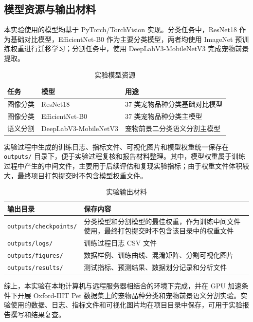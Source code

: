 \documentclass[UTF8,a4paper,12pt]{ctexart}
\begin{document}
\subsection{模型资源与输出材料}

本实验使用的模型均基于 PyTorch/TorchVision 实现。分类任务中，ResNet18 作为基础对比模型，EfficientNet-B0 作为主要分类模型，两者均使用 ImageNet 预训练权重进行迁移学习；分割任务中，使用 DeepLabV3-MobileNetV3 完成宠物前景提取。

\begin{table}[H]
\centering
\caption{实验模型资源}
\label{tab:model-resources}
\begin{tabular}{p{}p{}p{}}
\toprule
任务 & 模型 & 用途 \\
\midrule
图像分类 & ResNet18 & 37 类宠物品种分类基础对比模型 \\
图像分类 & EfficientNet-B0 & 37 类宠物品种分类主模型 \\
语义分割 & DeepLabV3-MobileNetV3 & 宠物前景二分类语义分割主模型 \\
\bottomrule
\end{tabular}
\end{table}

实验过程中生成的训练日志、指标文件、可视化图片和模型权重统一保存在 \texttt{outputs/} 目录下，便于实验过程复核和报告材料整理。其中，模型权重属于训练过程中产生的中间文件，主要用于后续评估和复现实验指标；由于权重文件体积较大，最终项目打包提交时不包含模型权重文件。

\begin{table}[H]
\centering
\caption{实验输出材料}
\label{tab:output-materials}
\begin{tabular}{p{}p{}}
\toprule
输出目录 & 保存内容 \\
\midrule
\texttt{outputs/checkpoints/} & 分类模型和分割模型的最佳权重，作为训练中间文件使用，最终打包提交时不包含该目录中的权重文件 \\
\texttt{outputs/logs/} & 训练过程日志 CSV 文件 \\
\texttt{outputs/figures/} & 数据样例、训练曲线、混淆矩阵、分割可视化图片 \\
\texttt{outputs/results/} & 测试指标、预测结果、数据划分记录和分析文件 \\
\bottomrule
\end{tabular}
\end{table}

综上，本实验在本地计算机与远程服务器相结合的环境下完成，并在 GPU 加速条件下开展 Oxford-IIIT Pet 数据集上的宠物品种分类和宠物前景语义分割实验。实验使用的数据、日志、指标文件和可视化图片均在项目目录中保存，可用于实验报告撰写和结果复查。
\end{document}
